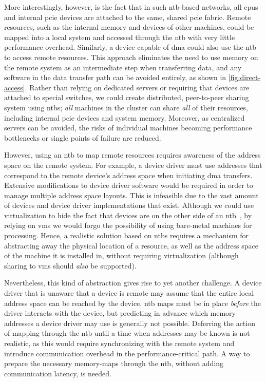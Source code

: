 More interestingly, however, is the fact that in such \gls{ntb}-based networks, all \glspl{cpu} and internal \gls{pcie} devices are attached to the same, shared \gls{pcie} fabric.
%
Remote resources, such as the internal memory and devices of other machines, could be mapped into a local system and accessed through the \gls{ntb} with very little performance overhead.
%
Similarly, a device capable of \gls{dma} could also use the \gls{ntb} to access remote resources.
%
This approach eliminates the need to use memory on the remote system as an intermediate step when transferring data, and any software in the data transfer path can be avoided entirely, as shown in \cref{fig:direct-access}.
%
Rather than relying on dedicated servers or requiring that devices are attached to special switches, we could create distributed, peer-to-peer sharing system using \glspl{ntb};
%
\emph{all} machines in the cluster can share \emph{all} of their resources, including internal \gls{pcie} devices and system memory. 
%
Moreover, as centralized servers can be avoided, the risks of individual machines becoming performance bottlenecks or single points of failure are reduced.




However, using an \gls{ntb} to map remote resources requires awareness of the address space on the remote system.
%
For example, a device driver must use addresses that correspond to the remote device's address space when initiating \gls{dma} transfers.
%
Extensive modifications to device driver software would be required in order to manage multiple address space layouts.
%
This is infeasible due to the vast amount of devices and device driver implementations that exist. 
%
Although we could use virtualization to hide the fact that devices are on the other side of an \gls{ntb}~\cite{Tu2013}, by relying on \glspl{vm} we would forgo the possibility of using bare-metal machines for processing.
%
Hence, a realistic solution based on \glspl{ntb} requires a mechanism for abstracting away the physical location of a resource, as well as the address space of the machine it is installed in, without requiring virtualization (although sharing to \glspl{vm} should \emph{also} be supported).



Nevertheless, this kind of abstraction gives rise to yet another challenge.
%
A device driver that is unaware that a device is remote may assume that the entire local address space can be reached by the device.
%
\Gls{ntb} maps must be in place \emph{before} the driver interacts with the device, but predicting in advance which memory addresses a device driver may use is generally not possible.
%
Deferring the action of mapping through the \gls{ntb} until a time when addresses may be known is not realistic, as this would require synchronizing with the remote system and introduce communication overhead in the performance-critical path.
%
A way to prepare the necessary memory-maps through the \gls{ntb}, without adding communication latency, is needed.




